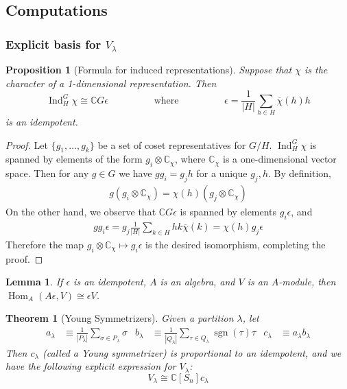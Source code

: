 \documentclass[11pt]{article}
\newtheorem{prop}{Proposition}
\newtheorem{thm}{Theorem}
\newtheorem{lem}{Lemma}
\theoremstyle{definition}
\newcommand{\C}{\mathbb C}
\newcommand{\Ind}{\operatorname{Ind}}
\newcommand{\Hom}{\operatorname{Hom}}
\newcommand{\sgn}{\operatorname{sgn}}
\begin{document}
\subsection{Computations}

\subsubsection{Explicit basis for $V_\lambda$}
\begin{prop}[Formula for induced representations]
  Suppose that $\chi$ is the character of a 1-dimensional representation. Then
  \begin{equation}
    \Ind_{H}^G \chi \cong \C G\epsilon \hspace{2cm}\text{where}\hspace{2cm}
    \epsilon = \frac{1}{|H|}\sum_{h \in H}\overline \chi(h)h
  \end{equation}
  is an idempotent.
\end{prop}

\begin{proof}
  Let $\{g_1, \dots, g_k\}$ be a set of coset representatives for $G/ H$.
  $\Ind_H^G \chi$ is spanned by elements of the form $g_i \otimes \C_\chi$, where
  $\C_{\chi}$ is a one-dimensional vector space. Then
  for any $g \in G$ we have $gg_i = g_jh$ for a unique $g_j, h$. By definition,
  \begin{align}
    g(g_i \otimes \C_{\chi}) = \chi(h)(g_j \otimes \C_{\chi})
  \end{align}
  On the other hand, we observe that $\C G \epsilon$ is spanned by elements $g_i
  \epsilon$, and
  \begin{align}
    g g_i \epsilon = g_j\frac{1}{|H|}\sum_{k \in H}hk\overline \chi(k) = \chi(h)g_j\epsilon
  \end{align}
  Therefore the map $g_i \otimes \C_\chi \mapsto g_i\epsilon$ is the desired
  isomorphism, completing the proof.
\end{proof}

\begin{lem}
  If $\epsilon$ is an idempotent, $A$ is an algebra, and $V$ is an $A$-module, then $\Hom_{A}(A\epsilon, V) \cong \epsilon
  V$. 
\end{lem}

\begin{thm}[Young Symmetrizers]
  Given a partition $\lambda$, let
  \begin{align}
    a_\lambda & \equiv \frac{1}{|P_\lambda|}\sum_{\sigma \in P_\lambda} \sigma & b_\lambda & \equiv \frac{1}{|Q_\lambda|}\sum_{\tau \in Q_\lambda}\sgn(\tau)\tau & c_{\lambda} &\equiv a_\lambda b_\lambda
  \end{align}
  Then $c_\lambda$ (called a \textit{Young symmetrizer}) is proportional to an idempotent, and we have the following explicit expression for $V_\lambda$:
  \begin{equation}
    V_\lambda \cong \C[S_n] c_\lambda
  \end{equation}
\end{thm}
\end{document}
